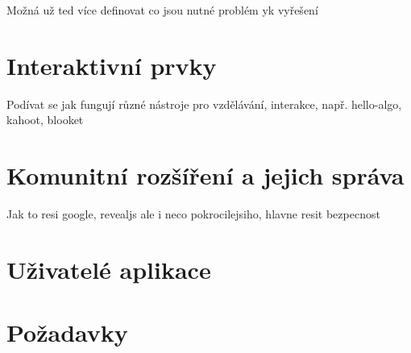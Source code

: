 Možná už ted více definovat co jsou nutné problém yk vyřešení

\section{Interaktivní prvky}

Podívat se jak fungují různé nástroje pro vzdělávání, interakce, např. hello-algo, kahoot, blooket

\section{Komunitní rozšíření a jejich správa}

Jak to resi google, revealjs ale i neco pokrocilejsiho, hlavne resit bezpecnost

\section{Uživatelé aplikace}

\section{Požadavky}